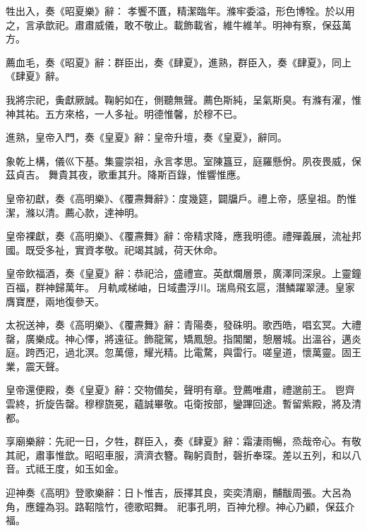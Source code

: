 \begin{pinyinscope}
 牲出入，奏《昭夏樂》辭：
 孝饗不匱，精潔臨年。滌牢委溢，形色博牷。於以用之，言承歆祀。肅肅威儀，敢不敬止。載飾載省，維牛維羊。明神有察，保茲萬方。



 薦血毛，奏《昭夏》辭：群臣出，奏《肆夏》，進熟，群臣入，奏《肆夏》，同上《肆夏》辭。



 我將宗祀，夤獻厥誠。鞠躬如在，側聽無聲。薦色斯純，呈氣斯臭。有滌有濯，惟神其祐。五方來格，一人多祉。明德惟馨，於穆不已。



 進熟，皇帝入門，奏《皇夏》辭：皇帝升壇，奏《皇夏》，辭同。



 象乾上構，儀巛下基。集靈崇祖，永言孝思。室陳簋豆，庭羅懸佾。夙夜畏威，保茲貞吉。
 舞貴其夜，歌重其升。降斯百錄，惟響惟應。



 皇帝初獻，奏《高明樂》、《覆燾舞辭》：度幾筵，闢牖戶。禮上帝，感皇祖。酌惟潔，滌以清。薦心款，達神明。



 皇帝裸獻，奏《高明樂》、《覆燾舞》辭：帝精求降，應我明德。禮殫義展，流祉邦國。既受多祉，實資孝敬。祀竭其誠，荷天休命。



 皇帝飲福酒，奏《皇夏》辭：恭祀洽，盛禮宣。英猷爛層景，廣澤同深泉。上靈鐘百福，群神歸萬年。
 月軌咸梯岫，日域盡浮川。瑞鳥飛玄扈，潛鱗躍翠漣。皇家膺寶歷，兩地復參天。



 太祝送神，奏《高明樂》、《覆燾舞》辭：青陽奏，發硃明。歌西皓，唱玄冥。大禮罄，廣樂成。神心懌，將遠征。飾龍駕，矯鳳憩。指閶闔，憩層城。出溫谷，邁炎庭。跨西汜，過北溟。忽萬億，耀光精。比電騖，與雷行。嗟皇道，懷萬靈。固王業，震天聲。



 皇帝還便殿，奏《皇夏》辭：交物備矣，聲明有章。登薦唯肅，禮邈前王。
 鬯齊雲終，折旋告罄。穆穆旒冕，蘊誠畢敬。屯衛按部，鑾蹕回途。暫留紫殿，將及清都。



 享廟樂辭：先祀一日，夕牲，群臣入，奏《肆夏》辭：霜淒雨暢，烝哉帝心。有敬其祀，肅事惟歆。昭昭車服，濟濟衣簪。鞠躬貢酎，磬折奉琛。差以五列，和以八音。式祗王度，如玉如金。



 迎神奏《高明》登歌樂辭：日卜惟吉，辰擇其良，奕奕清廟，黼黻周張。大呂為角，應鐘為羽。路鞀陰竹，德歌昭舞。
 祀事孔明，百神允穆。神心乃顧，保茲介福。




\end{pinyinscope}
